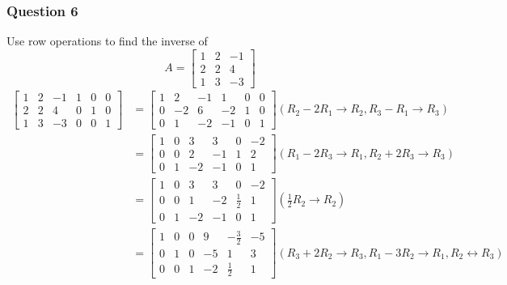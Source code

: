 \documentclass{math}
\begin{document}
\subsubsection*{Question 6}
Use row operations to find the inverse of
\[ A = \begin{bmatrix}
  1 & 2 & -1 \\
  2 & 2 & 4 \\
  1 & 3 & -3
\end{bmatrix} \]
\begin{align*}
  \left[\begin{array}{ccc|ccc}
    1 & 2 & -1 & 1 & 0 & 0 \\
    2 & 2 & 4 & 0 & 1 & 0 \\
    1 & 3 & -3 & 0 & 0 & 1
  \end{array}\right] &= \left[\begin{array}{ccc|ccc}
    1 & 2 & -1 & 1 & 0 & 0 \\
    0 & -2 & 6 & -2 & 1 & 0 \\
    0 & 1 & -2 & -1 & 0 & 1
  \end{array}\right] (R_2-2R_1 \to R_2, R_3-R_1 \to R_3) \\
  &= \left[\begin{array}{ccc|ccc}
    1 & 0 & 3 & 3 & 0 & -2 \\
    0 & 0 & 2 & -1 & 1 & 2 \\
    0 & 1 & -2 & -1 & 0 & 1
  \end{array}\right] (R_1-2R_3 \to R_1, R_2+2R_3 \to R_3) \\
  &= \left[\begin{array}{ccc|ccc}
    1 & 0 & 3 & 3 & 0 & -2 \\
    0 & 0 & 1 & -2 & \frac{1}{2} & 1 \\
    0 & 1 & -2 & -1 & 0 & 1
  \end{array}\right] (\frac{1}{2}R_2 \to R_2) \\
  &= \left[\begin{array}{ccc|ccc}
    1 & 0 & 0 & 9 & -\frac{3}{2} & -5 \\
    0 & 1 & 0 & -5 & 1 & 3 \\
    0 & 0 & 1 & -2 & \frac{1}{2} & 1
  \end{array}\right] (R_3+2R_2 \to R_3, R_1-3R_2\to R_1,
    R_2\leftrightarrow R_3)
\end{align*}
\end{document}
